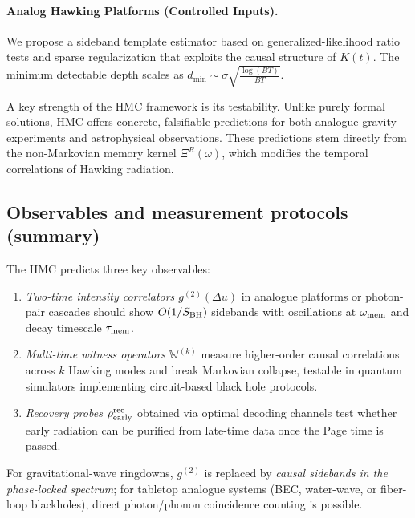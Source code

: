 \documentclass[a4paper,11pt]{article}
\newcommand{\HMC}{\textup{\textsc{HMC}}\xspace}
\theoremstyle{plain}
\theoremstyle{definition}
\theoremstyle{remark}
\begin{document}
\paragraph{Analog Hawking Platforms (Controlled Inputs).}
We propose a sideband template estimator based on generalized-likelihood ratio tests and sparse regularization that exploits the causal structure of $K(t)$. The minimum detectable depth scales as $d_{\min}\sim \sigma \sqrt{\frac{\log(BT)}{BT}}$. 



A key strength of the \HMC{} framework is its testability. Unlike purely formal solutions, \HMC{} offers concrete, falsifiable predictions for both analogue gravity experiments and astrophysical observations. These predictions stem directly from the non-Markovian memory kernel $\Xi^R(\omega)$, which modifies the temporal correlations of Hawking radiation.

\subsection{Observables and measurement protocols (summary)}
The \HMC{} predicts three key observables:
\begin{enumerate}[label=(\roman*)]
\item \emph{Two-time intensity correlators $g^{(2)}(\Delta u)$} in analogue platforms or photon-pair cascades should show $O(1/S_{\rm BH})$ sidebands with oscillations at $\omega_{\rm mem}$ and decay timescale $\tau_{\rm mem}$.
\item \emph{Multi-time witness operators $\mathbb{W}^{(k)}$} measure higher-order causal correlations across $k$ Hawking modes and break Markovian collapse, testable in quantum simulators implementing circuit-based black hole protocols.
\item \emph{Recovery probes $\rho^{\rm rec}_{\rm early}$} obtained via optimal decoding channels test whether early radiation can be purified from late-time data once the Page time is passed.
\end{enumerate}
For gravitational-wave ringdowns, $g^{(2)}$ is replaced by \emph{causal sidebands in the phase-locked spectrum}; for tabletop analogue systems (BEC, water-wave, or fiber-loop blackholes), direct photon/phonon coincidence counting is possible.
\end{document}
